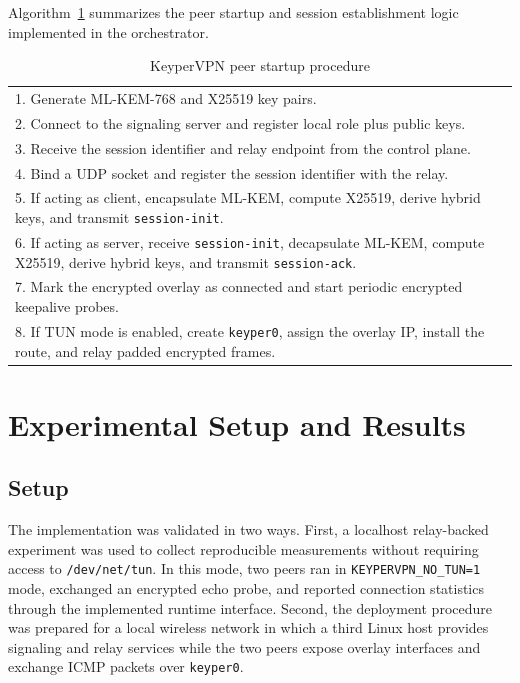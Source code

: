 \documentclass[conference]{IEEEtran}
\begin{document}
Algorithm~\ref{alg:startup} summarizes the peer startup and session establishment logic implemented in the orchestrator.

\begin{table}[t]
\caption{KeyperVPN peer startup procedure}
\label{alg:startup}
\centering
\footnotesize
\begin{tabular}{p{}}
\toprule
1. Generate ML-KEM-768 and X25519 key pairs.\\
2. Connect to the signaling server and register local role plus public keys.\\
3. Receive the session identifier and relay endpoint from the control plane.\\
4. Bind a UDP socket and register the session identifier with the relay.\\
5. If acting as client, encapsulate ML-KEM, compute X25519, derive hybrid keys, and transmit \texttt{session-init}.\\
6. If acting as server, receive \texttt{session-init}, decapsulate ML-KEM, compute X25519, derive hybrid keys, and transmit \texttt{session-ack}.\\
7. Mark the encrypted overlay as connected and start periodic encrypted keepalive probes.\\
8. If TUN mode is enabled, create \texttt{keyper0}, assign the overlay IP, install the route, and relay padded encrypted frames.\\
\bottomrule
\end{tabular}
\end{table}

\section{Experimental Setup and Results}
\subsection{Setup}
The implementation was validated in two ways. First, a localhost relay-backed experiment was used to collect reproducible measurements without requiring access to \texttt{/dev/net/tun}. In this mode, two peers ran in \texttt{KEYPERVPN\_NO\_TUN=1} mode, exchanged an encrypted echo probe, and reported connection statistics through the implemented runtime interface. Second, the deployment procedure was prepared for a local wireless network in which a third Linux host provides signaling and relay services while the two peers expose overlay interfaces and exchange ICMP packets over \texttt{keyper0}.
\end{document}
